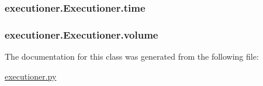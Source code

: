 \hypertarget{classexecutioner_1_1_executioner_ae8db6792c5c76a40637c27fe10522a24}{
\subsubsection[{time}]{\setlength{\rightskip}{0pt plus 5cm}executioner.\-Executioner.\-time}}\label{classexecutioner_1_1_executioner_ae8db6792c5c76a40637c27fe10522a24}
\hypertarget{classexecutioner_1_1_executioner_ae119707565d6e05c064def8b9d53579d}{
\subsubsection[{volume}]{\setlength{\rightskip}{0pt plus 5cm}executioner.\-Executioner.\-volume}}\label{classexecutioner_1_1_executioner_ae119707565d6e05c064def8b9d53579d}


The documentation for this class was generated from the following file\-:\begin{DoxyCompactItemize}
\item 
\hyperlink{executioner_8py}{executioner.\-py}\end{DoxyCompactItemize}
